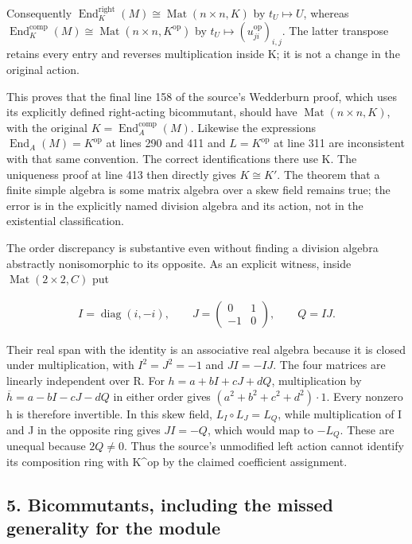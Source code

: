 \documentclass[11pt]{article}
\begin{document}
Consequently \(\operatorname{End}_{K}^{\mathrm{right}}(M)\cong \operatorname{Mat}(n\times n,K)\) by \(t_{U}\mapsto U\), whereas \(\operatorname{End}_{K}^{\mathrm{comp}}(M)\cong \operatorname{Mat}(n\times n,K^{\mathrm{op}})\) by \(t_{U}\mapsto (u_{ji}^{\mathrm{op}})_{i,j}\). The latter transpose retains every entry and reverses multiplication inside K; it is not a change in the original action.

This proves that the final line 158 of the source's Wedderburn proof, which uses its explicitly defined right-acting bicommutant, should have \(\operatorname{Mat}(n\times n,K)\), with the original \(K=\operatorname{End}_{A}^{\mathrm{comp}}(M)\). Likewise the expressions \(\operatorname{End}_{A}(M)=K^{\mathrm{op}}\) at lines 290 and 411 and \(L=K^{\mathrm{op}}\) at line 311 are inconsistent with that same convention. The correct identifications there use K. The uniqueness proof at line 413 then directly gives \(K\cong K'\). The theorem that a finite simple algebra is some matrix algebra over a skew field remains true; the error is in the explicitly named division algebra and its action, not in the existential classification.

The order discrepancy is substantive even without finding a division algebra abstractly nonisomorphic to its opposite. As an explicit witness, inside \(\operatorname{Mat}(2\times 2,C)\) put

\[\begin{gathered}
I = \operatorname{diag}(i,-i),\qquad J = \begin{pmatrix}0&1\\-1&0\end{pmatrix},\qquad Q = IJ.
\end{gathered}\]

Their real span with the identity is an associative real algebra because it is closed under multiplication, with \(I^{2}=J^{2}=-1\) and \(JI=-IJ\). The four matrices are linearly independent over R. For \(h=a+bI+cJ+dQ\), multiplication by \(\overline{h}=a-bI-cJ-dQ\) in either order gives \((a^{2}+b^{2}+c^{2}+d^{2})\cdot 1\). Every nonzero h is therefore invertible. In this skew field, \(L_{I}\circ L_{J}=L_{Q}\), while multiplication of I and J in the opposite ring gives \(JI=-Q\), which would map to \(-L_{Q}\). These are unequal because \(2Q\ne 0\). Thus the source's unmodified left action cannot identify its composition ring with K\^{}op by the claimed coefficient assignment.

\subsection{5. Bicommutants, including the missed generality for the module}\label{bicommutants-including-the-missed-generality-for-the-module}
\end{document}
